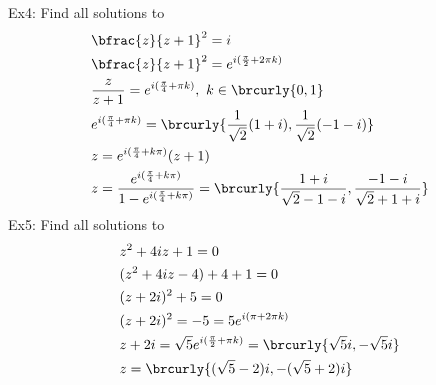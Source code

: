 Ex4: Find all solutions to
\begin{align*}
    &\bfrac{z}{z+1}^2=i\\
    &\bfrac{z}{z+1}^2=e^{i(\frac{\pi}{2}+2\pi k)}\\
    &\frac{z}{z+1}=e^{i(\frac{\pi}{4}+\pi k)},\ k\in\brcurly{0,1}\\
    &e^{i(\frac{\pi}{4}+\pi k)}=\brcurly{\frac{1}{\sqrt{2}}(1+i),\frac{1}{\sqrt{2}}(-1-i)}\\
    &z=e^{i(\frac{\pi}{4}+k\pi)}(z+1)\\
    &z=\frac{e^{i(\frac{\pi}{4}+k\pi)}}{1-e^{i(\frac{\pi}{4}+k\pi)}}=\brcurly{\frac{1+i}{\sqrt{2}-1-i},\frac{-1-i}{\sqrt{2}+1+i}}
\end{align*}
Ex5: Find all solutions to
\begin{align*}
    &z^2+4iz+1=0\\
    &(z^2+4iz-4)+4+1=0\\
    &(z+2i)^2+5=0\\
    &(z+2i)^2=-5=5e^{i(\pi+2\pi k)}\\
    &z+2i=\sqrt{5}e^{i(\frac{\pi}{2}+\pi k)}=\brcurly{\sqrt{5}i,-\sqrt{5}i}\\
    &z=\brcurly{(\sqrt{5}-2)i,-(\sqrt{5}+2)i}
\end{align*}